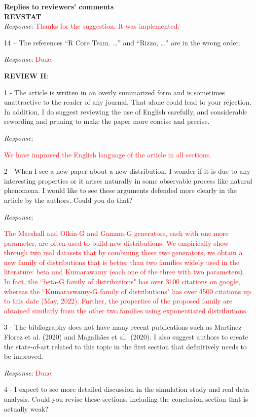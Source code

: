 \documentclass[version=last,12pt,{"maintainersDelight"}]{scrlttr2}
\begin{document}
\begin{letter}{\textbf{Replies to reviewers' comments}\\\textbf{REVSTAT}\\}
\emph{Response}:
\textcolor{red}{Thanks for the suggestion. It was implemented.}

14 -- The references ``R Core Team. \ldots{}'' and ``Rizzo, \ldots{}'' are in the wrong order.

\emph{Response}: \textcolor{red}{Done.}

\textbf{REVIEW II}:

1 - The article is written in an overly summarized form and is sometimes unattractive to the reader of any journal. That alone could lead to your rejection. In addition, I do suggest reviewing the use of English carefully, and considerable rewording and pruning to make the paper more concise and precise.

\emph{Response}:

\textcolor{red}{We have improved the English language of the article in all sections.}

2 - When I see a new paper about a new distribution, I wonder if it is due to any interesting properties or it arises naturally in some
observable process like natural phenomena. I would like to see these
arguments defended more clearly in the article by the authors. Could you do that?



\emph{Response}:

\textcolor{red}{The Marshall and Olkin-G and Gamma-G generators, each with one more parameter, are often used to build new distributions. We empirically show through two real datasets that by combining these two generators, we obtain a new family of distributions that is better than two families widely used in the literature: beta and Kumarawamy (each one of the three with two parameters). In fact, the ``beta-G family of distributions" has over 3100 citations on google, whereas the ``Kumaraswamy-G family of distributions" has over 4500 citations  up to this date (May, 2022). Further, the properties of the proposed family are obtained similarly from the other two families using exponentiated distributions.} 

3 - The bibliography does not have many recent publications such as
Martinez-Florez et al. (2020) and Magalhães et al.~(2020). I also
suggest authors to create the state-of-art related to this topic in the first section that definitively needs to be improved.

\emph{Response}: \textcolor{red}{Done.}

4 - I expect to see more detailed discussion in the simulation study and real data analysis. Could you revise these sections, including the conclusion section that is actually weak?


\end{letter}
\end{document}
